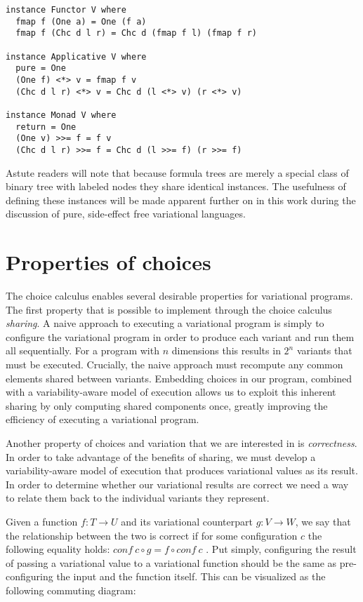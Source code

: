 \documentclass[12pt,oneside]{book}
\begin{document}
\begin{lstlisting}
instance Functor V where
  fmap f (One a) = One (f a)
  fmap f (Chc d l r) = Chc d (fmap f l) (fmap f r)
  
instance Applicative V where
  pure = One
  (One f) <*> v = fmap f v
  (Chc d l r) <*> v = Chc d (l <*> v) (r <*> v)
  
instance Monad V where
  return = One
  (One v) >>= f = f v
  (Chc d l r) >>= f = Chc d (l >>= f) (r >>= f)
\end{lstlisting}

Astute readers will note that because formula trees are merely a special class of binary tree with
labeled nodes they share identical instances. The usefulness of defining these instances will be made
apparent further on in this work during the discussion of pure, side-effect free variational languages.

\section{Properties of choices}
\label{sec:props}

The choice calculus enables several desirable properties for variational programs.
The first property that is possible to implement through the choice calculus \emph{sharing}. A naive approach to executing a variational program is simply to
configure the variational program in order to produce each variant and run them all sequentially.
For a program with $n$ dimensions this results in $2^n$ variants that must be executed. Crucially,
the naive approach must recompute any common elements shared between variants. Embedding
choices in our program, combined with a variability-aware model of execution allows us to exploit this
inherent sharing by only computing shared components once, greatly improving the efficiency of
executing a variational program.

Another property of choices and variation that we are interested in is \emph{correctness}. In order
to take advantage of the benefits of sharing, we must develop a variability-aware model of execution
that produces variational values as its result. In order to determine whether our variational results
are correct we need a way to relate them back to the individual variants they represent.

Given a function $f : T \rightarrow U$ and its variational counterpart $g : V \rightarrow W$, we say that
the relationship between the two is correct if for some configuration $c$ the following equality holds:
$\mathit{conf}\ c \circ g = f \circ \mathit{conf}\ c$ \cite{hubbard2016formula}. Put simply, configuring the result
of passing a variational value to a variational function should be the same as pre-configuring the input
and the function itself. This can be visualized as the following commuting diagram:
\end{document}
